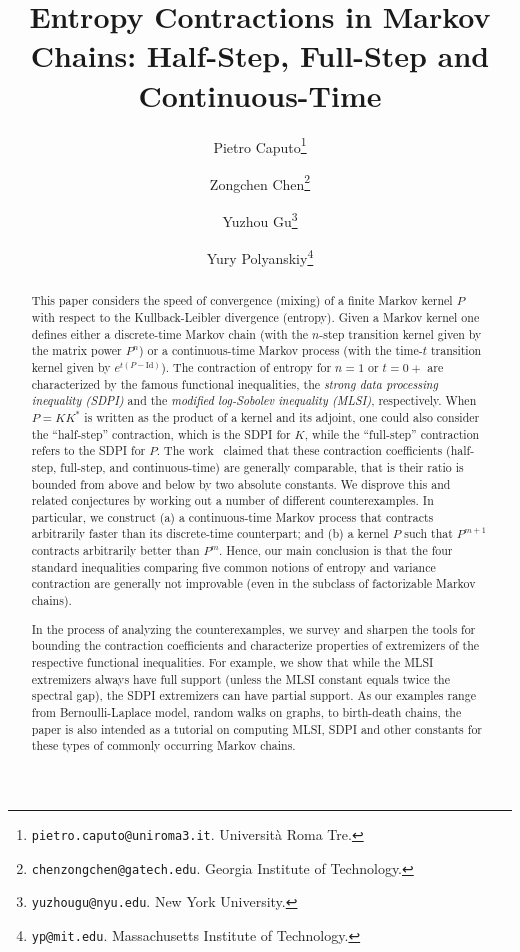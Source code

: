 \documentclass[11pt]{article}
\theoremstyle{definition}
\begin{document}
\title{Entropy Contractions in Markov Chains: Half-Step, Full-Step and Continuous-Time}
\author{
  Pietro Caputo\thanks{\texttt{pietro.caputo@uniroma3.it}. Universit\`{a} Roma Tre.}
  \and
  Zongchen Chen\thanks{\texttt{chenzongchen@gatech.edu}. Georgia Institute of Technology.}
  \and
  Yuzhou Gu\thanks{\texttt{yuzhougu@nyu.edu}. New York University.}
  \and
  Yury Polyanskiy\thanks{\texttt{yp@mit.edu}. Massachusetts Institute of Technology.}
}
\date{}

\maketitle

\begin{abstract}
  This paper considers the speed of convergence (mixing) of a finite Markov kernel $P$ with respect to
  the Kullback-Leibler divergence (entropy). Given a Markov kernel one defines either a discrete-time
  Markov chain (with the $n$-step transition kernel given by the matrix power $P^n$) or a
  continuous-time Markov process (with the time-$t$ transition kernel given by
  $e^{t(P-\mathrm{Id})}$). The contraction of entropy for $n=1$ or $t=0+$ are characterized by the famous
  functional inequalities,
  the \textit{strong data processing inequality (SDPI)} and the \textit{modified log-Sobolev inequality
  (MLSI)}, respectively.
  When $P=KK^*$ is written as the product of a kernel and its adjoint, one could also consider the ``half-step'' contraction, which is the SDPI for $K$, while the ``full-step'' contraction refers to the SDPI for $P$.
  The work~\cite{del2003contraction} claimed that these contraction
  coefficients (half-step, full-step, and continuous-time) are generally comparable, that is their ratio is bounded from above and below by
  two absolute constants. We disprove this and related conjectures by working out a number of
  different counterexamples. In particular, we construct (a)
  a continuous-time Markov process that contracts arbitrarily faster than its discrete-time
  counterpart; and
  (b) a kernel $P$ such that $P^{m+1}$ contracts arbitrarily better than $P^m$.
  Hence, our main conclusion is that the four standard inequalities comparing five common notions of entropy and variance contraction are generally not
  improvable (even in the subclass of factorizable Markov chains).

  In the process of analyzing the counterexamples, we survey and sharpen the tools for bounding the
  contraction coefficients and characterize properties of extremizers of
  the respective functional inequalities.
  For example, we show that while the MLSI extremizers
  always have full support (unless the MLSI constant equals twice the spectral gap), the SDPI
  extremizers can have partial support.
  As our examples range from Bernoulli-Laplace model, random walks on
  graphs, to birth-death chains, the paper is also intended as a tutorial on computing MLSI, SDPI
  and other constants for these types of commonly occurring Markov chains.


\end{abstract}
\end{document}
